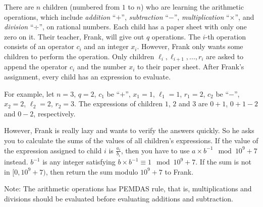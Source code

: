There are $n$ children (numbered from $1$ to $n$) who are learning
the arithmetic operations, which include \emph{addition} ``$+$'', 
\emph{subtraction} ``$-$'', 
\emph{multiplication} ``$\times$'', and \emph{division} ``$\div$'', on 
rational numbers.
Each child has a paper sheet with only one zero on it. 
Their teacher, Frank, will give out $q$ operations. 
The $i$-th operation consists of an operator $c_i$ and an integer $x_i$.
However, Frank only wants some children to perform the operation.
Only children $\ell_i,\ell_{i+1},\dots,r_i$ are asked to append the 
operator $c_i$ and the number $x_i$ to their paper sheet.
After Frank's assignment, every child has an expression to evaluate.

For example, let $n=3$, $q=2$, $c_1$ be ``$+$'', $x_1=1$, $\ell_1=1$, $r_1=2$, 
$c_2$ be ``$-$'',  $x_2=2$, $\ell_2=2$, $r_2=3$. The expressions of children
$1$, $2$ and $3$ are $0+1$, $0+1-2$ and $0-2$, respectively.

However, Frank is really lazy and wants to verify the answers quickly. 
So he asks you to calculate the sums of the values of all children's 
expressions.
If the value of the expression assigned to child $i$ is $\frac{a_i}{b_i}$, 
then you have to use $a\times b^{-1}\mod 10^9+7$ instead. $b^{-1}$ is any 
integer satisfying $b\times b^{-1}\equiv 1\mod 10^9+7$. 
If the sum is not in $[0, 10^9+7)$, then return the sum modulo $10^9+7$ to
Frank.

Note: The arithmetic operations has PEMDAS rule, that is, 
multiplications and divisions should be evaluated before evaluating additions
and subtraction.
